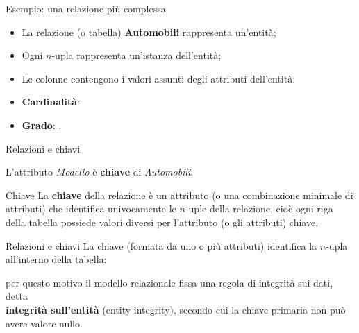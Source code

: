 %
\begin{frame}{Esempio: una relazione pi\`u complessa}
\begin{minipage}[t]{0.6\linewidth}
    \begin{center}
        \AutomobiliRelationship
    \end{center}
\end{minipage}%
\hfill%
\begin{minipage}[t]{0.4\linewidth}
\begin{center}
    \begin{itemize}[<+->]
        \item La relazione (o tabella) \textbf{Automobili} rappresenta un'entit\`a;
        \item Ogni $n$-upla rappresenta un'istanza dell'entit\`a;
        \item Le colonne contengono i valori assunti degli attributi dell'entit\`a.
        \item \textbf{Cardinalit\`a}: 
        \item \textbf{Grado}: .
    \end{itemize}
\end{center}
\end{minipage}
\end{frame}
%
\begin{frame}{Relazioni e chiavi}
\vspace{-.9cm}
\begin{center}
    \AutomobiliRelationship
\end{center}
\pause

L'attributo \textit{Modello} \`e \textbf{chiave} di \textit{Automobili}.

\pause
\begin{block}{Chiave}
    La \textbf{chiave} della relazione \`e un attributo (o una combinazione minimale di attributi) che identifica univocamente le $n$-uple della relazione, cio\`e ogni riga della tabella possiede valori diversi per l'attributo (o gli attributi) chiave.
\end{block}
\end{frame}
%
\begin{frame}{Relazioni e chiavi}
La chiave (formata da uno o pi\`u attributi) identifica la $n$-upla all'interno della tabella:
\pause

per questo motivo il modello relazionale fissa una regola di integrit\`a sui dati, detta\\ \textbf{integrit\`a sull'entit\`a} (entity integrity), secondo cui la chiave primaria non pu\`o avere valore nullo.
\end{frame}
